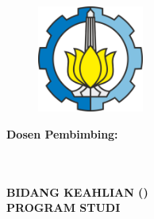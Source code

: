 \begin{flushleft}


    \begin{figure}[h]
        \flushleft \raggedright
        \includegraphics[width = 3.5cm, height = 3.5cm]{src/resources/its-logo.png}
    \end{figure}

    \vspace{3.0cm}

    { \selectfont \large \bfseries \MakeUppercase
        {\essay}
    }

    \vspace{0.9cm}

    { \selectfont \Large \bfseries \MakeUppercase
        {\thetitle}
    }

    \vspace{0.9cm}

    \begin{singlespace}
   	    { \selectfont \large \bfseries \MakeUppercase
   	        {\theauthor}
        }
    \end{singlespace}

    \vspace{0.9cm}

    \begin{singlespace}
   	    { \selectfont \normalsize \bfseries
   	        Dosen Pembimbing: \\
                {\firstSupervisorName} \\
                {\secondSupervisorName}
        }
    \end{singlespace}

    \vspace{0.9cm}

    \begin{singlespace}
   	    { \selectfont
            \normalsize \bfseries \MakeUppercase {
                {\postgraduateProgram} \\
                Bidang Keahlian {\postgraduateCourseClass} ({\postgraduateCourseClassShort}) \\
                Program Studi {\postgraduateDegree} {\postgraduateConcentration} \\
                {\postgraduateDepartment} \\
                {\postgraduateFaculty} \\
                {\postgraduateUniversity} \\
                {\postgraduateCity} \\
                {\postgraduateYear}
            }
        }
    \end{singlespace}

\end{flushleft}

\restoregeometry

\clearpage
